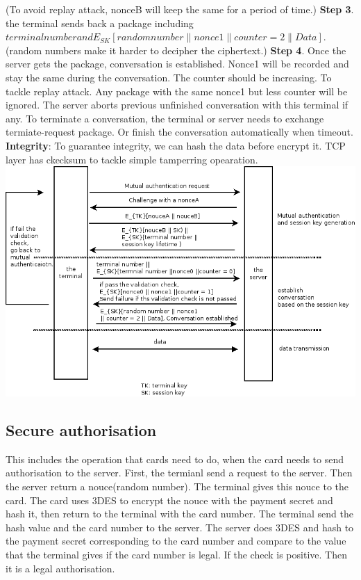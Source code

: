 \documentclass{article}
\begin{document}
(To avoid replay attack, nonceB will keep the same for a period of time.)
        \newline
\textbf{Step 3}. the terminal sends back a package including $terminal number and E_{SK}[random number \parallel nonce1 \parallel counter = 2 \parallel Data]$. 
(random numbers make it harder to decipher the ciphertext.)
        \newline
\textbf{Step 4}. Once the server gets the package, conversation is established. 
Nonce1 will be recorded and stay the same during the conversation.
The counter should be increasing. 
To tackle replay attack. Any package with the same nonce1 but less counter will be ignored.
The server aborts previous unfinished conversation with this terminal if any.
        \newline
To terminate a conversation, the terminal or server needs to exchange termiate-request package. 
Or finish the conversation automatically when timeout.
        \newline
\textbf{Integrity}:
To guarantee integrity, we can hash the data before encrypt it. TCP layer has ckecksum to tackle simple tamperring opearation.
        \newline
\includegraphics[width=7in]{Diagram2.png}
        \newline
        \subsection*{Secure authorisation}
This includes the operation that cards need to do,
when the card needs to send authorisation to the server. 
        \newline
First, the termianl send a request to the server. 
Then the server return a nouce(random number). 
The terminal gives this nouce to the card. 
The card uses 3DES to encrypt the nouce with the payment secret and hash it, then return to the terminal with the card number. 
The terminal send the hash value and the card number to the server. 
The server does 3DES and hash to the payment secret corresponding to the card number and compare to the value that the terminal gives if the card number is legal. 
If the check is positive. 
Then it is a legal authorisation.
\end{document}
